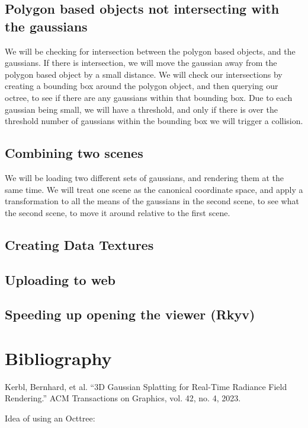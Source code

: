 \documentclass {article}
\begin{document}
\subsection{Polygon based objects not intersecting with the gaussians}

We will be checking for intersection between the polygon based objects, and the gaussians. If there is intersection, we will move the gaussian away from the polygon based object by a small distance. We will check our intersections by creating a bounding box around the polygon object, and then querying our octree, to see if there are any gaussians within that bounding box. Due to each gaussian being small, we will have a threshold, and only if there is over the threshold number of gaussians within the bounding box we will trigger a collision.


\subsection{Combining two scenes}

We will be loading two different sets of gaussians, and rendering them at the same time. We will treat one scene as the canonical coordinate space, and apply a transformation to all the means of the gaussians in the second scene, to see what the second scene, to move it around relative to the first scene.


\subsection{Creating Data Textures}

\subsection{Uploading to web}

\subsection{Speeding up opening the viewer (Rkyv)}


\section{Bibliography}
     Kerbl, Bernhard, et al. “3D Gaussian Splatting for Real-Time Radiance Field Rendering.” ACM Transactions on Graphics, vol. 42, no. 4, 2023.

     Idea of using an Octtree:
\end{document}
